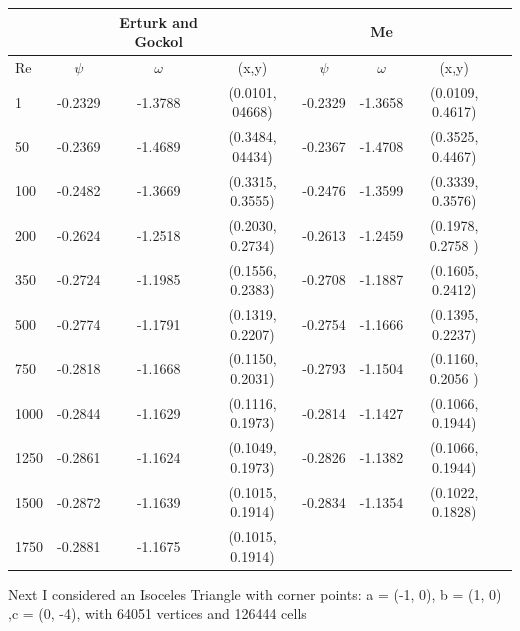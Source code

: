 \documentclass[a4paper,norsk]{article}
\begin{document}
\begin{tabular}{l*{6}{c}r}
   & &Erturk and Gockol & & & Me\\
   \hline 
  Re & $\psi$ & $\omega$ &(x,y) & $\psi$ & $\omega$ & (x,y)  \\
  1   &   -0.2329  &-1.3788  & (0.0101, 04668) &-0.2329 & -1.3658  & (0.0109, 0.4617)  \\
  50   &  -0.2369 & -1.4689 & (0.3484, 04434)  & -0.2367 &-1.4708 & (0.3525, 0.4467)    \\
  100  & -0.2482 & -1.3669 & (0.3315, 0.3555)   & -0.2476 & -1.3599 &(0.3339, 0.3576)  \\
  200   & -0.2624 &-1.2518  & (0.2030, 0.2734)  & -0.2613 & -1.2459 & (0.1978, 0.2758 ) \\
  350   & -0.2724 & -1.1985 & (0.1556, 0.2383) &-0.2708 & -1.1887 & (0.1605, 0.2412)   \\
  500   & -0.2774 & -1.1791 &  (0.1319, 0.2207)  & -0.2754 &  -1.1666 & (0.1395, 0.2237)       \\
  750   &  -0.2818 & -1.1668 &  (0.1150, 0.2031) & -0.2793  & -1.1504  & (0.1160, 0.2056 ) \\
  1000   & -0.2844 & -1.1629 &(0.1116, 0.1973) & -0.2814  & -1.1427 & (0.1066, 0.1944) \\
  1250   & -0.2861 & -1.1624 & (0.1049, 0.1973) & -0.2826 & -1.1382 & (0.1066, 0.1944)   \\
  1500   & -0.2872 & -1.1639 & (0.1015, 0.1914)  & -0.2834 & -1.1354  & (0.1022, 0.1828)\\
  1750   &  -0.2881 & -1.1675 & (0.1015, 0.1914) &   &\\ 
\hline
\end{tabular}
\newline
\newline
\newline 
Next I considered an Isoceles Triangle with corner points: \newline
a = (-1, 0), b = (1, 0) ,c = (0, -4), with 64051 vertices and 126444 cells\newline
\newline
\end{document}
